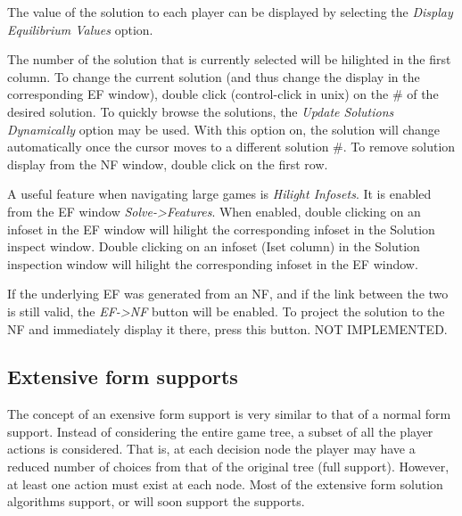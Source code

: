The value of the solution to each player can be displayed by selecting the 
{\em Display Equilibrium Values} option.

The number of the solution that is currently selected will be hilighted in the first
column.  To change the current solution (and thus change the display in the 
corresponding EF window), double click (control-click in unix) on the \# of the
desired solution.  To quickly browse the solutions, the {\em Update Solutions Dynamically}
option may be used.  With this option on, the solution will change automatically once
the cursor moves to a different solution \#.  To remove solution display from the NF window,
double click on the first row.

A useful feature when navigating large games is {\em Hilight Infosets}.  It is enabled
from the EF window {\em Solve->Features}.  When enabled, double clicking on an
infoset in the EF window will hilight the corresponding infoset in the Solution inspect
window.  Double clicking on an infoset (Iset column) in the Solution inspection window
will hilight the corresponding infoset in the EF window.

If the underlying EF was generated from an NF, and if the link between the two is still
valid, the {\em EF->NF} button will be enabled.  To project the solution to the NF and
immediately display it there, press this button.  NOT IMPLEMENTED.
 
\subsection{Extensive form supports}
The concept of an exensive form support is very similar to that of a normal form support.
Instead of considering the entire game tree, a subset of all the player actions is considered.
That is, at each decision node the player may have a reduced number of choices from that of
the original tree (full support).  However, at least one action must exist at each node.  Most 
of the extensive form solution algorithms support, or will soon support the supports.

